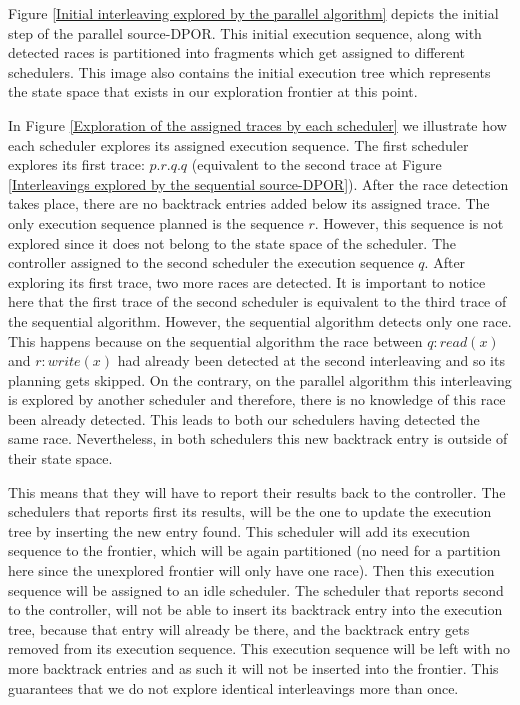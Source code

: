 

Figure \ref{Initial interleaving explored by the parallel algorithm} depicts the initial step of the parallel source-DPOR. 
This initial execution sequence, along with detected races is partitioned into fragments which get assigned to different schedulers.
This image also contains the initial execution tree which represents the state space that exists in our exploration frontier
at this point.


In Figure \ref{Exploration of the assigned traces by each scheduler} we illustrate how each scheduler explores its assigned 
execution sequence. The first scheduler explores its first trace: $p.r.q.q$ (equivalent to the second trace 
at Figure \ref{Interleavings explored by the sequential source-DPOR}). After the race detection takes place,
there are no backtrack entries added below its assigned trace. The only execution sequence planned is the sequence $r$. However,
this sequence is not explored since it does not belong to the state space of the scheduler. The controller assigned to the
second scheduler the execution sequence $q$. After exploring its first trace, two more races are detected. It is important to notice
here that the first trace of the second scheduler is equivalent to the third trace of the sequential algorithm. However,
the sequential algorithm detects only one race. This happens because on the sequential algorithm the race between $q: read(x)$ and
$r:write(x)$ had already been detected at the second interleaving and so its planning gets skipped. 
On the contrary, on the parallel algorithm this interleaving
is explored by another scheduler and therefore, there is no knowledge of this race been already detected. This leads to
both our schedulers having detected the same race. Nevertheless, in both schedulers this new backtrack entry is outside of their
state space. 

This means that they will have to report their results back to the controller. The schedulers that reports first its results, 
will be the one to update the execution tree by inserting the new entry found. This
scheduler will add its execution sequence to the frontier, which will be again partitioned
(no need for a partition here since the unexplored frontier will only have one race). Then this execution sequence will be
assigned to an idle scheduler. The scheduler that reports second to the controller, will not be able to insert its 
backtrack entry into the execution tree, because that entry will already be there, and the backtrack entry gets removed
from its execution sequence. This execution sequence will be left with no more backtrack entries and as such it will not be
inserted into the frontier. This guarantees that we do not explore identical interleavings more than once.

